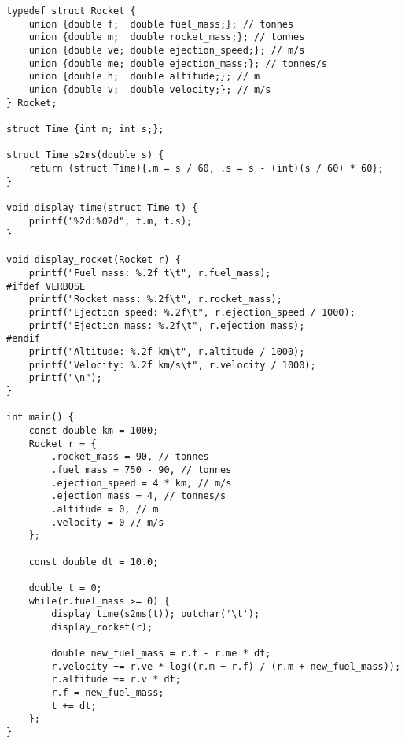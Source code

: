 \documentclass[french,a4paper,addpoints,11pt]{exam}
\begin{document}
\begin{questions}
\begin{solution}
\begin{lstlisting}
typedef struct Rocket {
    union {double f;  double fuel_mass;}; // tonnes
    union {double m;  double rocket_mass;}; // tonnes
    union {double ve; double ejection_speed;}; // m/s
    union {double me; double ejection_mass;}; // tonnes/s
    union {double h;  double altitude;}; // m
    union {double v;  double velocity;}; // m/s
} Rocket;

struct Time {int m; int s;};

struct Time s2ms(double s) {
    return (struct Time){.m = s / 60, .s = s - (int)(s / 60) * 60};
}

void display_time(struct Time t) {
    printf("%2d:%02d", t.m, t.s);
}

void display_rocket(Rocket r) {
    printf("Fuel mass: %.2f t\t", r.fuel_mass);
#ifdef VERBOSE
    printf("Rocket mass: %.2f\t", r.rocket_mass);
    printf("Ejection speed: %.2f\t", r.ejection_speed / 1000);
    printf("Ejection mass: %.2f\t", r.ejection_mass);
#endif
    printf("Altitude: %.2f km\t", r.altitude / 1000);
    printf("Velocity: %.2f km/s\t", r.velocity / 1000);
    printf("\n");
}

int main() {
    const double km = 1000;
    Rocket r = {
        .rocket_mass = 90, // tonnes
        .fuel_mass = 750 - 90, // tonnes
        .ejection_speed = 4 * km, // m/s
        .ejection_mass = 4, // tonnes/s
        .altitude = 0, // m
        .velocity = 0 // m/s
    };

    const double dt = 10.0;

    double t = 0; 
    while(r.fuel_mass >= 0) {
        display_time(s2ms(t)); putchar('\t');
        display_rocket(r);

        double new_fuel_mass = r.f - r.me * dt;
        r.velocity += r.ve * log((r.m + r.f) / (r.m + new_fuel_mass));
        r.altitude += r.v * dt;
        r.f = new_fuel_mass;
        t += dt;
    };
}        
    \end{lstlisting}
    \end{solution}
    \end{questions}
\end{document}
